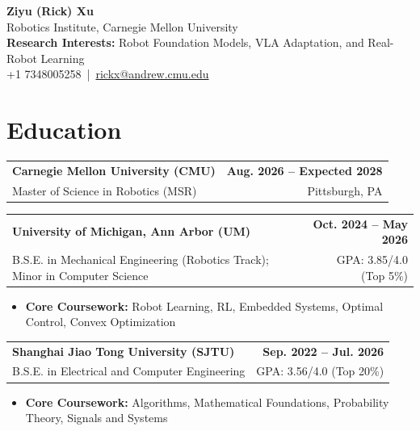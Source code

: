 \documentclass[11pt,letterpaper]{article}
\makeatletter
\newcommand{\resumeSubheading}[4]{
    \begin{tabularx}{\textwidth}{@{}Xr@{}}
        \textbf{#1} & \textbf{#2} \\
        #3 & #4 \\
    \end{tabularx}
}
\makeatother
\begin{document}
\begin{center}
    {\LARGE \textbf{Ziyu (Rick) Xu}} \\[2pt]
    {\small Robotics Institute, Carnegie Mellon University} \\[1pt]
    {\small \textbf{Research Interests:} Robot Foundation Models, VLA Adaptation, and Real-Robot Learning} \\[1pt]
    {\small
    +1 7348005258
    \,|\, 
    \href{mailto:rickx@andrew.cmu.edu}{rickx@andrew.cmu.edu}
    } \\[1pt]
\end{center}

\section*{Education}
\resumeSubheading
{Carnegie Mellon University (CMU)}
{Aug. 2026 -- Expected 2028}
{\hspace*{1.4em}Master of Science in Robotics (MSR)}
{Pittsburgh, PA}
\resumeSubheading
{University of Michigan, Ann Arbor (UM)}
{Oct. 2024 -- May 2026}
{\hspace*{1.4em}B.S.E. in Mechanical Engineering (Robotics Track); Minor in Computer Science}
{GPA: 3.85/4.0 (Top 5\%)}
\begin{itemize}[leftmargin=2.4em, itemsep=0.5pt, topsep=0pt]
    \item \textbf{Core Coursework:} Robot Learning, RL, Embedded Systems, Optimal Control, Convex Optimization
\end{itemize}

\resumeSubheading
{Shanghai Jiao Tong University (SJTU)}
{Sep. 2022 -- Jul. 2026}
{\hspace*{1.4em}B.S.E. in Electrical and Computer Engineering}
{GPA: 3.56/4.0 (Top 20\%)}
\begin{itemize}[leftmargin=2.4em, itemsep=0.5pt, topsep=0pt]
    \item \textbf{Core Coursework:} Algorithms, Mathematical Foundations, Probability Theory, Signals and Systems
\end{itemize}
\end{document}
